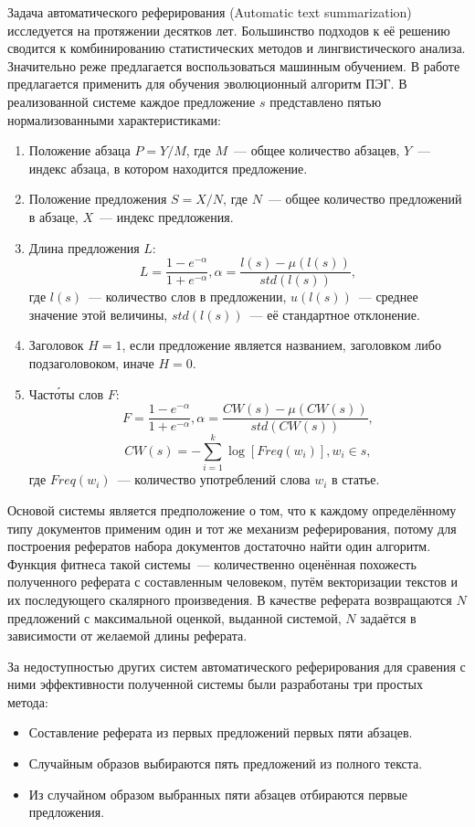 Задача автоматического реферирования (Automatic text summarization) исследуется на протяжении десятков лет. Большинство подходов к её решению сводится к комбинированию статистических методов и лингвистического анализа. Значительно реже предлагается воспользоваться машинным обучением. В работе~\cite{ZhuliXie:2004:COLING} предлагается применить для обучения эволюционный алгоритм ПЭГ. В реализованной системе каждое предложение $s$ представлено пятью нормализованными характеристиками:
\begin{enumerate}
  \item Положение абзаца $P = Y / M$, где $M$~--- общее количество абзацев, $Y$~--- индекс абзаца, в котором находится предложение.
  \item Положение предложения $S = X / N$, где $N$~--- общее количество предложений в абзаце, $X$~--- индекс предложения.
  \item Длина предложения $L$: $$L = \frac{1-e^{-\alpha}}{1+e^{-\alpha}}, \alpha=\frac{l(s) - \mu(l(s))}{std(l(s))},$$ где $l(s)$~--- количество слов в предложении, $u(l(s))$~--- среднее значение этой величины, $std(l(s))$~--- её стандартное отклонение.
  \item Заголовок $H=1$, если предложение является названием, заголовком либо подзаголовоком, иначе $H=0$.
  \item Част\'{о}ты слов $F$:$$F=\frac{1-e^{-\alpha}}{1+e^{-\alpha}}, \alpha=\frac{CW(s) - \mu(CW(s))}{std(CW(s))},$$ $$CW(s)=-\sum\limits_{i=1}^k\log{[Freq(w_i)]}, w_i\in{s},$$ где $Freq(w_i)$~--- количество употреблений слова $w_i$ в статье.
\end{enumerate}

Основой системы является предположение о том, что к каждому определённому типу документов применим один и тот же механизм реферирования, потому для построения рефератов набора документов достаточно найти один алгоритм. Функция фитнеса такой системы~--- количественно оценённая похожесть полученного реферата с составленным человеком, путём векторизации текстов и их последующего скалярного произведения. В качестве реферата возвращаются $N$ предложений с максимальной оценкой, выданной системой, $N$ задаётся в зависимости от желаемой длины реферата.

За недоступностью других систем автоматического реферирования для сравения с ними эффективности полученной системы были разработаны три простых метода:
\begin{itemize}
  \item Составление реферата из первых предложений первых пяти абзацев.
  \item Случайным образов выбираются пять предложений из полного текста.
  \item Из случайном образом выбранных пяти абзацев отбираются первые предложения.
\end{itemize}

